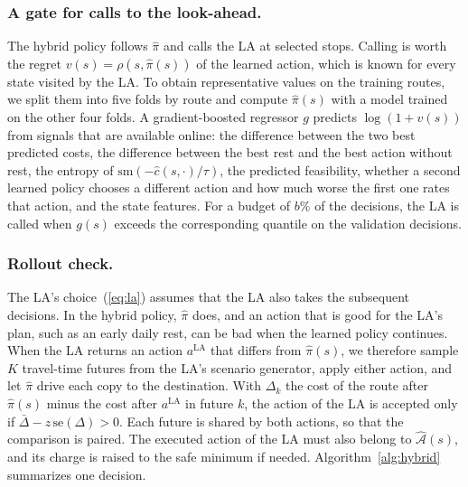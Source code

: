 \documentclass[runningheads]{llncs}
\begin{document}
\subsubsection{A gate for calls to the look-ahead.}
The hybrid policy follows $\hat\pi$ and calls the LA at selected stops. Calling
is worth the regret $v(s)=\rho(s,\hat\pi(s))$ of the learned action, which is
known for every state visited by the LA. To obtain representative values on
the training routes, we split them into five folds by route and compute
$\hat\pi(s)$ with a model trained on the other four folds. A gradient-boosted
regressor $g$ predicts $\log(1+v(s))$ from signals that are available online:
the difference between the two best predicted costs, the difference between
the best rest and the best action without rest, the entropy of
$\mathrm{sm}(-\hat c(s,\cdot)/\tau)$, the predicted feasibility, whether a
second learned policy chooses a different action and how much worse the first
one rates that action, and the state features. For a budget of $b\%$ of the
decisions, the LA is called when $g(s)$ exceeds the corresponding quantile on
the validation decisions.

\subsubsection{Rollout check.}
The LA's choice~(\ref{eq:la}) assumes that the LA also takes the subsequent
decisions. In the hybrid policy, $\hat\pi$ does, and an action that is good for
the LA's plan, such as an early daily rest, can be bad when the learned policy
continues. When the LA returns an action $a^{\mathrm{LA}}$ that differs from
$\hat\pi(s)$, we therefore sample $K$ travel-time futures from the LA's
scenario generator, apply either action, and let $\hat\pi$ drive each copy to
the destination. With $\Delta_k$ the cost of the route after $\hat\pi(s)$ minus
the cost after $a^{\mathrm{LA}}$ in future $k$, the action of the LA is
accepted only if $\bar\Delta-z\,\mathrm{se}(\Delta)>0$. Each future is shared
by both actions, so that the comparison is paired. The executed action of the
LA must also belong to $\hat{\mathcal{A}}(s)$, and its charge is raised to the
safe minimum if needed. Algorithm~\ref{alg:hybrid} summarizes one decision.
\end{document}
